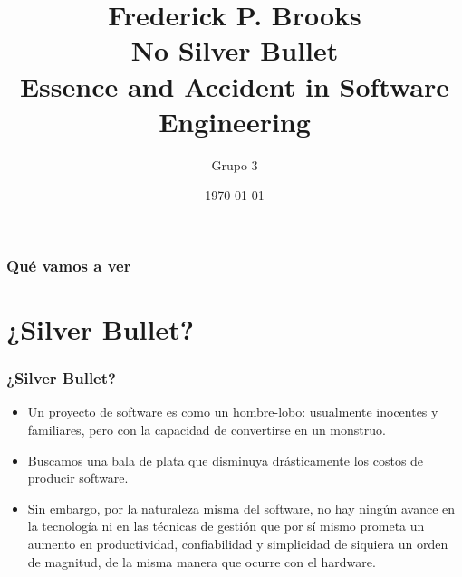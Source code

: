 \documentclass{beamer}
\title[No Silver Bullet]{Frederick P. Brooks \\ No Silver Bullet \\ Essence and Accident in Software Engineering} %
\author{Grupo 3} %
\institute[UBA - ISW2] %
{
Ingeniería de Software II - 1er Cuatrimestre 2016 \\ %
\medskip
\textit{} %
}
\date{\today} %
\begin{document}
\begin{frame}
\titlepage %
\end{frame}

\begin{frame}
\frametitle{Qué vamos a ver} %
\tableofcontents %
\end{frame}


\section{¿Silver Bullet?}
\begin{frame}
\frametitle{¿Silver Bullet?}

\begin{itemize}

\item Un proyecto de software es como un hombre-lobo: usualmente inocentes y familiares, pero con la capacidad de convertirse en un monstruo.\\
\item Buscamos una bala de plata que disminuya drásticamente los costos de producir software.\\
\item Sin embargo, por la naturaleza misma del software, no hay ningún avance en la tecnología ni en las técnicas de gestión que por sí mismo prometa un aumento en productividad, confiabilidad y simplicidad de siquiera un orden de magnitud, de la misma manera que ocurre con el hardware.\\
\end{itemize}

\end{frame}
\end{document}
